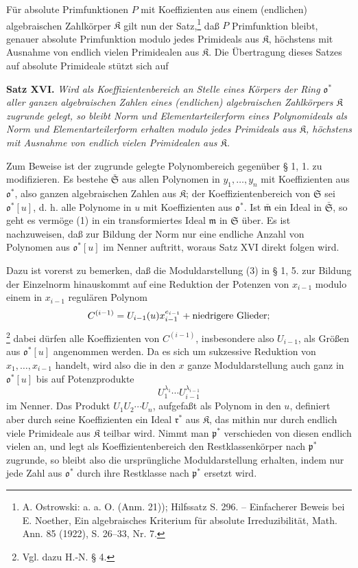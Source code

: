 \documentclass[11pt]{article}
\providecommand{\frakS}{\mathfrak S}
\providecommand{\frakm}{\mathfrak m}
\providecommand{\frakp}{\mathfrak p}
\begin{document}
Für absolute Primfunktionen $P$ mit Koeffizienten aus einem (endlichen) algebraischen Zahlkörper $\mathfrak K$ gilt nun der Satz,\footnote{A. Ostrowski: a. a. O. (Anm. 21)); Hilfssatz S. 296. -- Einfacherer Beweis bei E. Noether, Ein algebraisches Kriterium für absolute Irreduzibilität, Math. Ann. 85 (1922), S. 26--33, Nr. 7.} daß $P$ Primfunktion bleibt, genauer absolute Primfunktion modulo jedes Primideals aus $\mathfrak K$, höchstens mit Ausnahme von endlich vielen Primidealen aus $\mathfrak K$. Die Übertragung dieses Satzes auf absolute Primideale stützt sich auf

\textbf{Satz XVI.} \emph{Wird als Koeffizientenbereich an Stelle eines Körpers der Ring $\mathfrak o^*$ aller ganzen algebraischen Zahlen eines (endlichen) algebraischen Zahlkörpers $\mathfrak K$ zugrunde gelegt, so bleibt Norm und Elementarteilerform eines Polynomideals als Norm und Elementarteilerform erhalten modulo jedes Primideals aus $\mathfrak K$, höchstens mit Ausnahme von endlich vielen Primidealen aus $\mathfrak K$.}

Zum Beweise ist der zugrunde gelegte Polynombereich gegenüber § 1, 1. zu modifizieren. Es bestehe $\bar{\frakS}$ aus allen Polynomen in $y_1,\ldots,y_n$ mit Koeffizienten aus $\mathfrak o^*$, also ganzen algebraischen Zahlen aus $\mathfrak K$; der Koeffizientenbereich von $\frakS$ sei $\mathfrak o^*[u]$, d. h. alle Polynome in $u$ mit Koeffizienten aus $\mathfrak o^*$. Ist $\bar{\frakm}$ ein Ideal in $\bar{\frakS}$, so geht es vermöge (1) in ein transformiertes Ideal $\frakm$ in $\frakS$ über. Es ist nachzuweisen, daß zur Bildung der Norm nur eine endliche Anzahl von Polynomen aus $\mathfrak o^*[u]$ im Nenner auftritt, woraus Satz XVI direkt folgen wird.

Dazu ist vorerst zu bemerken, daß die Moduldarstellung (3) in § 1, 5. zur Bildung der Einzelnorm hinauskommt auf eine Reduktion der Potenzen von $x_{i-1}$ modulo einem in $x_{i-1}$ regulären Polynom
\[
 C^{(i-1)}=U_{i-1}(u)x_{i-1}^{e_{i-1}}+\hbox{niedrigere Glieder};
\]
\footnote{Vgl. dazu H.-N. § 4.} dabei dürfen alle Koeffizienten von $C^{(i-1)}$, insbesondere also $U_{i-1}$, als Größen aus $\mathfrak o^*[u]$ angenommen werden. Da es sich um sukzessive Reduktion von $x_1,\ldots,x_{i-1}$ handelt, wird also die in den $x$ ganze Moduldarstellung auch ganz in $\mathfrak o^*[u]$ bis auf Potenzprodukte
\[
 U_1^{\lambda_1}\cdots U_{i-1}^{\lambda_{i-1}}
\]
im Nenner. Das Produkt $U_1U_2\cdots U_n$, aufgefaßt als Polynom in den $u$, definiert aber durch seine Koeffizienten ein Ideal $\mathfrak r^*$ aus $\mathfrak K$, das mithin nur durch endlich viele Primideale aus $\mathfrak K$ teilbar wird. Nimmt man $\frakp^*$ verschieden von diesen endlich vielen an, und legt als Koeffizientenbereich den Restklassenkörper nach $\frakp^*$ zugrunde, so bleibt also die ursprüngliche Moduldarstellung erhalten, indem nur jede Zahl aus $\mathfrak o^*$ durch ihre Restklasse nach $\frakp^*$ ersetzt wird.
\end{document}
